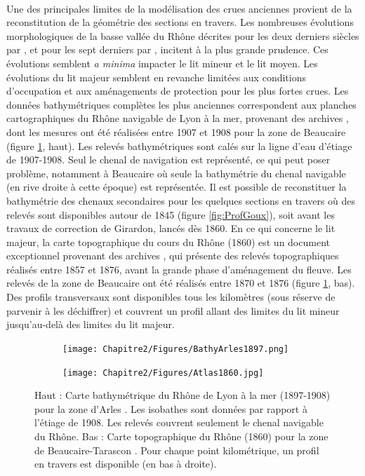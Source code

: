 	\paragraph{} Une des principales limites de la modélisation des crues anciennes provient de la reconstitution de la géométrie des sections en travers. Les nombreuses évolutions morphologiques de la basse vallée du Rhône décrites pour les deux derniers siècles par \citet{raccasi_mutations_2008}, et pour les sept derniers	par \citet{pichard_sept_2014}, incitent à la plus grande prudence. Ces évolutions semblent \textit{a minima} impacter le lit mineur et le lit moyen. Les évolutions du lit majeur semblent en revanche limitées aux conditions d'occupation et aux aménagements de protection pour les plus fortes crues. Les données bathymétriques complètes les plus anciennes correspondent aux planches cartographiques du Rhône navigable de Lyon à la mer, provenant des archives \citet{cnr_cartes_1908}, dont les mesures ont été réalisées entre 1907 et 1908 pour la zone de Beaucaire (figure \ref{fig:BathyTopo}, haut). Les relevés bathymétriques sont calés sur la ligne d'eau d'étiage de 1907-1908. Seul le chenal de navigation est représenté, ce qui peut poser problème, notamment à Beaucaire où seule la bathymétrie du chenal navigable (en rive droite à cette époque) est représentée. Il est possible de reconstituer la bathymétrie des chenaux secondaires pour les quelques sections en travers où des relevés sont disponibles autour de 1845 (figure \ref{fig:ProfGoux}), soit avant les travaux de correction de Girardon, lancés dès 1860. En ce qui concerne le lit majeur, la carte topographique du cours du Rhône (1860) est un document exceptionnel provenant des archives \citet{cnr_carte_1876}, qui présente des relevés topographiques réalisés entre 1857 et 1876, avant la grande phase d'aménagement du fleuve. Les relevés de la zone de Beaucaire ont été réalisés entre 1870 et 1876 (figure \ref{fig:BathyTopo}, bas). Des profils transversaux sont disponibles tous les kilomètres (sous réserve de parvenir à les déchiffrer) et couvrent un profil allant des limites du lit mineur jusqu'au-delà des limites du lit majeur.
		
	\begin{figure}[h]
		\centering
		\begin{subfigure}{.6\linewidth}
			\texttt{[image: Chapitre2/Figures/BathyArles1897.png]}
		\end{subfigure}
		
		\vspace{7pt}
		
		\begin{subfigure}{0.5\linewidth}
			\texttt{[image: Chapitre2/Figures/Atlas1860.jpg]}
		\end{subfigure}
		\caption{Haut : Carte bathymétrique du Rhône de Lyon à la mer (1897-1908) pour la zone d'Arles \citep{cnr_cartes_1908}. Les isobathes sont données par rapport à l'étiage de 1908. Les relevés couvrent seulement le chenal navigable du Rhône. Bas : Carte topographique du Rhône (1860) pour la zone de Beaucaire-Tarascon \citep{cnr_carte_1876}. Pour chaque point kilométrique, un profil en travers est disponible (en bas à droite).}
		\label{fig:BathyTopo}
	\end{figure}
	
